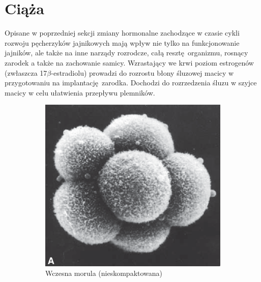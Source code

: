 \documentclass[two column, twoside, a4paper]{article}
\begin{document}
\section{Ciąża}

Opisane w poprzedniej sekcji zmiany hormonalne zachodzące w czasie cykli rozwoju pęcherzyków jajnikowych mają wpływ nie tylko na funkcjonowanie jajników, ale także na inne narządy rozrodcze, całą resztę organizmu, rosnący zarodek a także na zachowanie samicy. Wzrastający we krwi poziom estrogenów (zwłaszcza 17$\beta$-estradiolu) prowadzi do rozrostu błony śluzowej macicy w przygotowaniu na implantację zarodka. Dochodzi do rozrzedzenia śluzu w szyjce macicy w celu ułatwienia przepływu plemników. \autocite{Sawicki2017, Sadler2012}

 \begin{figure}[tp]
	 \begin{tcolorbox}
		 \centering
		 \begin{subfigure}[b]{0.51\textwidth}
			 \includegraphics[width=\textwidth]{./figures/blastomeres.png}
		\caption{Wczesna morula (nieskompaktowana)}\label{fig::blastomeres:a}
		\end{subfigure}
		 \begin{subfigure}[b]{0.4755\textwidth}

\end{subfigure}
\end{tcolorbox}
\end{figure}
\end{document}
